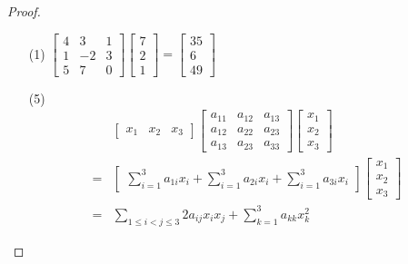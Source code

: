 \begin{proof}
    \begin{enumerate}
        \item[(1)] \(\begin{bmatrix}
                4 & 3 & 1 \\1&-2&3\\5&7&0
            \end{bmatrix}\begin{bmatrix}
                7 \\2\\1
            \end{bmatrix}=\begin{bmatrix}
                35 \\6\\49
            \end{bmatrix}\)
        \item[(5)]
            \begin{align*}
                  & \begin{bmatrix}
                        x_1 & x_2 & x_3
                    \end{bmatrix}
                \begin{bmatrix}
                    a_{11} & a_{12} & a_{13} \\
                    a_{12} & a_{22} & a_{23} \\
                    a_{13} & a_{23} & a_{33}
                \end{bmatrix}
                \begin{bmatrix}
                    x_1 \\x_2\\x_3
                \end{bmatrix}                                                                                    \\
                = & \begin{bmatrix}\sum_{i=1}^3a_{1i}x_i+\sum_{i=1}^3a_{2i}x_i+\sum_{i=1}^3a_{3i}x_i\end{bmatrix}
                \begin{bmatrix}x_1 \\x_2 \\x_3\end{bmatrix}                                                       \\
                = & \sum_{1 \leq i<j \leq 3} 2 a_{i j} x_i x_j+\sum_{k=1}^3 a_{k k} x_k^2
            \end{align*}

    \end{enumerate}
\end{proof}

